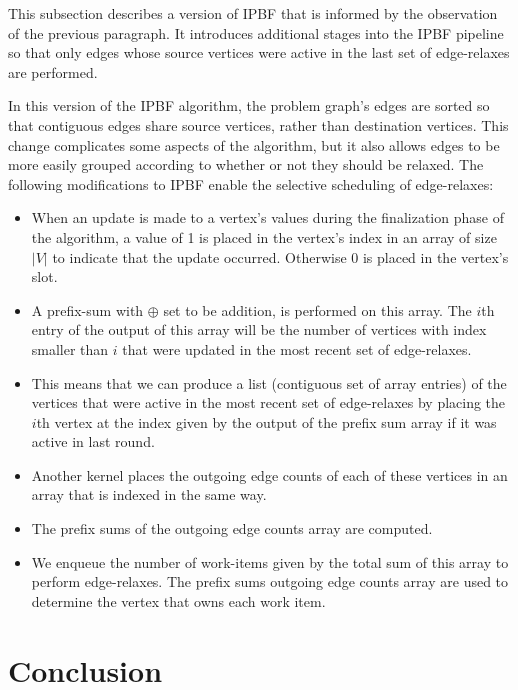 \documentclass[12pt,twoside]{reedthesis}
\begin{document}
This subsection describes a version of IPBF that is informed by the observation of the previous paragraph. It introduces additional stages into the IPBF pipeline so that only edges whose source vertices were active in the last set of edge-relaxes are performed.

In this version of the IPBF algorithm, the problem graph's edges are sorted so that contiguous edges share source vertices, rather than destination vertices. This change complicates some aspects of the algorithm, but it also allows edges to be more easily grouped according to whether or not they should be relaxed. The following modifications to IPBF enable the selective scheduling of edge-relaxes:

\begin{itemize}

\item When an update is made to a vertex's values during the finalization phase of the algorithm, a value of 1 is placed in the vertex's index in an array of size $|V|$ to indicate that the update occurred. Otherwise 0 is placed in the vertex's slot.

\item A prefix-sum with $\oplus$ set to be addition, is performed on this array. The $i$th entry of the output of this array will be the number of vertices with index smaller than $i$ that were updated in the most recent set of edge-relaxes. 

\item This means that we can produce a list (contiguous set of array entries) of the vertices that were active in the most recent set of edge-relaxes by placing the $i$th vertex at the index given by the output of the prefix sum array if it was active in last round.

\item Another kernel places the outgoing edge counts of each of these vertices in an array that is indexed in the same way.

\item The prefix sums of the outgoing edge counts array are computed.

\item We enqueue the number of work-items given by the total sum of this array to perform edge-relaxes. The prefix sums outgoing edge counts array are used to determine the vertex that owns each work item.

\end{itemize}


\chapter*{Conclusion}
\setcounter{chapter}{4}
\setcounter{section}{0}
\end{document}
